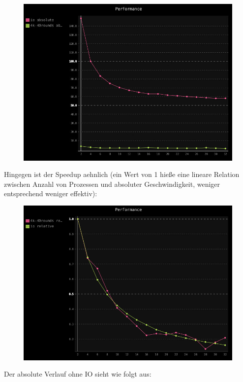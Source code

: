 \begin{figure}[htbp]
\centering
\includegraphics{pics/io-vs-no-io absolute.jpg}
\end{figure}

Hingegen ist der Speedup aehnlich (ein Wert von 1 hieße eine lineare
Relation zwischen Anzahl von Prozessen und absoluter Geschwindigkeit,
weniger entsprechend weniger effektiv):

\begin{figure}[htbp]
\centering
\includegraphics{pics/io-vs-no-io rel.jpg}
\end{figure}

Der absolute Verlauf ohne IO sieht wie folgt aus:

